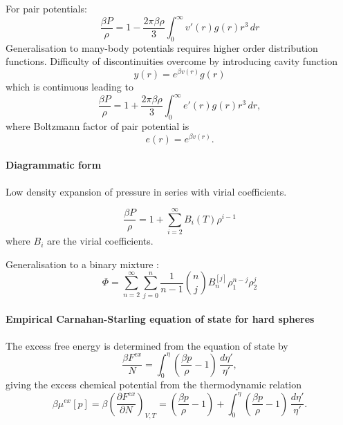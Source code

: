 For pair potentials:
\begin{equation}
  \frac{\beta P}{\rho} =
  1 - \frac{2 \pi \beta \rho}{3}
  \int_0^\infty v'(r) g(r) r^3 \, dr
\end{equation}
Generalisation to many-body potentials requires higher order distribution functions.
Difficulty of discontinuities overcome by introducing cavity function
\begin{equation}
  y(r) = e^{\beta v(r)} g(r)
\end{equation}
which is continuous  leading to
\begin{equation}
  \frac{\beta P}{\rho} =
  1 + \frac{2 \pi \beta \rho}{3}
  \int_0^\infty e'(r) g(r) r^3 \, dr,
\end{equation}
where Boltzmann factor of pair potential is
\begin{equation}
  e(r) = e^{\beta v(r)}.
\end{equation}

\paragraph{Diagrammatic form}
Low density expansion of pressure in series with virial coefficients.

\begin{equation}
  \frac{\beta P}{\rho} =
  1 + \sum_{i=2}^\infty B_i(T) \rho^{i-1}
\end{equation}
where $B_i$ are the virial coefficients.

Generalisation to a binary mixture : \cite{Hansen-Goos2014}
\begin{equation}
  \Phi = \sum_{n=2}^\infty \sum_{j=0}^{n}
  \frac{1}{n-1} {n \choose j} B_n^{[j]} \rho_1^{n-j} \rho_2^j
\end{equation}

\paragraph{Empirical Carnahan-Starling equation of state for hard spheres}

The excess free energy is determined from the equation of state by
\begin{equation}
  \frac{\beta F^{ex}}{N}
  = \int_0^\eta \left( \frac{\beta p}{\rho} - 1 \right) \, \frac{d\eta'}{\eta'},
\end{equation}
giving the excess chemical potential from the thermodynamic relation
\begin{equation}\label{eq:chemical-potential}
  \beta \mu^{ex}[p]
  = \beta \left( \frac{\partial F^{ex}}{\partial N} \right)_{V,T}
  = \left( \frac{\beta p}{\rho} - 1 \right)
  + \int_0^\eta \left( \frac{\beta p}{\rho} - 1 \right) \, \frac{d\eta'}{\eta'}.
\end{equation}

